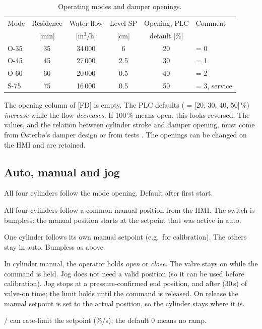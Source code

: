 \documentclass[11pt,a4paper]{article}
\begin{document}
\begin{table}[htbp]
\centering
\caption{Operating modes and damper openings.}
\label{tab:modes}
\begin{small}
\begin{tabularx}{\textwidth}{@{}lccccL@{}}
\toprule
Mode & Residence & Water flow & Level SP & Opening, PLC & Comment \\
 & [min] & [m$^3$/h] & [cm] & default [\%] & \\
\midrule
O-35 & 35 & 34\,000 & 6   & 20 &  = 0 \\
O-45 & 45 & 27\,000 & 2.5 & 30 &  = 1 \\
O-60 & 60 & 20\,000 & 0.5 & 40 &  = 2 \\
S-75 & 75 & 16\,000 & 0.5 & 50 &  = 3, service \\
\bottomrule
\end{tabularx}
\end{small}
\end{table}
The opening column of [FD] is empty. The PLC defaults ( = [20, 30, 40, 50]\,\%)
\emph{increase} while the flow \emph{decreases}. If 100\,\% means open, this looks reversed. The
values, and the relation between cylinder stroke and damper opening, must come from Østerbø's damper
design or from tests . The openings can be changed on the HMI and are retained.

\subsection{Auto, manual and jog}
\begin{description}[nosep, leftmargin=20mm, style=nextline]
  \item[Outlet auto] All four cylinders follow the mode opening. Default after first start.
  \item[Outlet manual] All four cylinders follow a common manual position from the HMI. The switch is
        bumpless: the manual position starts at the setpoint that was active in auto.
  \item[Cylinder manual] One cylinder follows its own manual setpoint (e.g.\ for calibration). The
        others stay in auto. Bumpless as above.
  \item[Jog] In cylinder manual, the operator holds \emph{open} or \emph{close}. The valve stays on
        while the command is held. Jog does not need a valid position (so it can be used before
        calibration). Jog stops at a pressure-confirmed end position, and after
         (30\,s) of valve-on time; the limit holds until the command is
        released. On release the manual setpoint is set to the actual position, so the cylinder
        stays where it is.
\end{description}
 /  can rate-limit the setpoint (\%/s); the default 0 means no
ramp.
\end{document}
